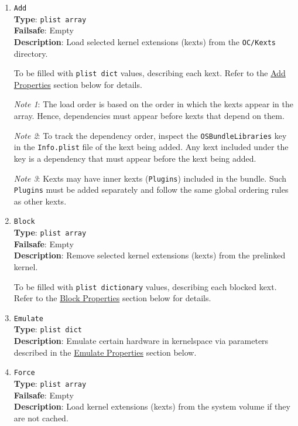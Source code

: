 \documentclass[]{article}
\begin{document}
\begin{enumerate}
\item
  \texttt{Add}\\
  \textbf{Type}: \texttt{plist\ array}\\
  \textbf{Failsafe}: Empty\\
  \textbf{Description}: Load selected kernel extensions (kexts) from the \texttt{OC/Kexts} directory.

  To be filled with \texttt{plist\ dict} values, describing each kext. Refer to
  the \hyperref[kernelpropsadd]{Add Properties} section below for details.

  \emph{Note 1}: The load order is based on the order in which the kexts appear in
  the array. Hence, dependencies must appear before kexts that depend on them.

  \emph{Note 2}: To track the dependency order, inspect the \texttt{OSBundleLibraries}
  key in the \texttt{Info.plist} file of the kext being added. Any kext included
  under the key is a dependency that must appear before the kext being added.

  \emph{Note 3}: Kexts may have inner kexts (\texttt{Plugins}) included in the bundle.
  Such \texttt{Plugins} must be added separately and follow the same global ordering
  rules as other kexts.

\item
  \texttt{Block}\\
  \textbf{Type}: \texttt{plist\ array}\\
  \textbf{Failsafe}: Empty\\
  \textbf{Description}: Remove selected kernel extensions (kexts) from the prelinked kernel.

  To be filled with \texttt{plist\ dictionary} values, describing each blocked kext.
  Refer to the \hyperref[kernelpropsblock]{Block Properties} section below for details.

\item
  \texttt{Emulate}\\
  \textbf{Type}: \texttt{plist\ dict}\\
  \textbf{Description}: Emulate certain hardware in kernelspace via parameters
  described in the \hyperref[kernelpropsemu]{Emulate Properties} section below.

\item
  \texttt{Force}\\
  \textbf{Type}: \texttt{plist\ array}\\
  \textbf{Failsafe}: Empty\\
  \textbf{Description}: Load kernel extensions (kexts) from the system volume if they are not cached.


\end{enumerate}
\end{document}
